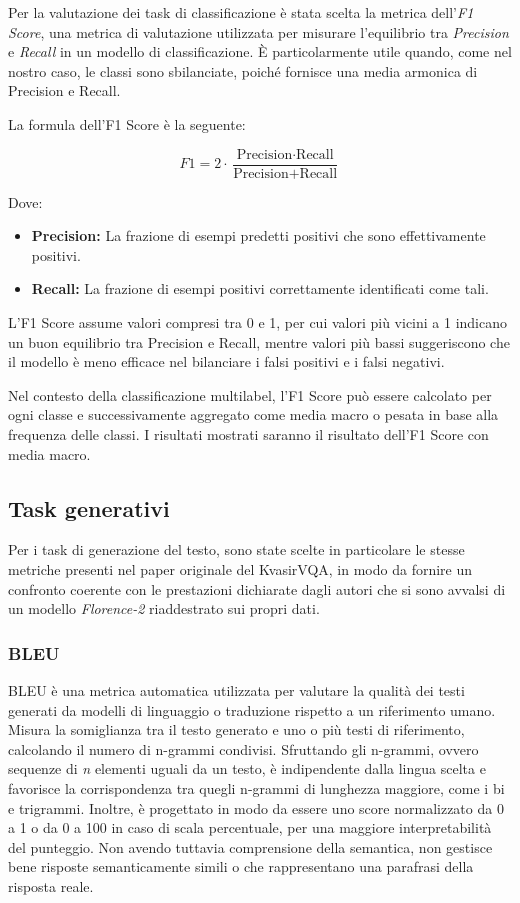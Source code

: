 \documentclass[../main.tex]{subfiles}
\begin{document}
Per la valutazione dei task di classificazione è stata scelta la metrica dell'\textit{F1 Score}, una metrica di valutazione utilizzata per misurare l'equilibrio tra \textit{Precision} e \textit{Recall} in un modello di classificazione. 
È particolarmente utile quando, come nel nostro caso, le classi sono sbilanciate, poiché fornisce una media armonica di Precision e Recall.

La formula dell'F1 Score è la seguente:

\[
F1 = 2 \cdot \frac{\text{Precision} \cdot \text{Recall}}{\text{Precision} + \text{Recall}}
\]

Dove:
\begin{itemize}
    \item \textbf{Precision:} La frazione di esempi predetti positivi che sono effettivamente positivi.
    \item \textbf{Recall:} La frazione di esempi positivi correttamente identificati come tali.
\end{itemize}

L'F1 Score assume valori compresi tra 0 e 1, per cui valori più vicini a 1 indicano un buon equilibrio tra Precision e Recall, mentre valori più bassi suggeriscono che il modello è meno efficace nel bilanciare i falsi positivi e i falsi negativi.

Nel contesto della classificazione multilabel, l'F1 Score può essere calcolato per ogni classe e successivamente aggregato come media macro o pesata in base alla frequenza delle classi. 
I risultati mostrati saranno il risultato dell'F1 Score con media macro.

\subsection{Task generativi}

Per i task di generazione del testo, sono state scelte in particolare le stesse metriche presenti nel paper originale del KvasirVQA, in modo da fornire un confronto coerente con le prestazioni dichiarate dagli autori che si sono avvalsi di un modello \textit{Florence-2} riaddestrato sui propri dati.

\subsubsection{BLEU} 

BLEU \cite{10.3115/1073083.1073135} è una metrica automatica utilizzata per valutare la qualità dei testi generati da modelli di linguaggio o traduzione rispetto a un riferimento umano. Misura la somiglianza tra il testo generato e uno o più testi di riferimento, calcolando il numero di n-grammi condivisi.
Sfruttando gli n-grammi, ovvero sequenze di \textit{n} elementi uguali da un testo, è indipendente dalla lingua scelta e favorisce la corrispondenza tra quegli n-grammi di lunghezza maggiore, come i bi e trigrammi.
Inoltre, è progettato in modo da essere uno score normalizzato da 0 a 1 o da 0 a 100 in caso di scala percentuale, per una maggiore interpretabilità del punteggio.
Non avendo tuttavia comprensione della semantica, non gestisce bene risposte semanticamente simili o che rappresentano una parafrasi della risposta reale.
\end{document}
